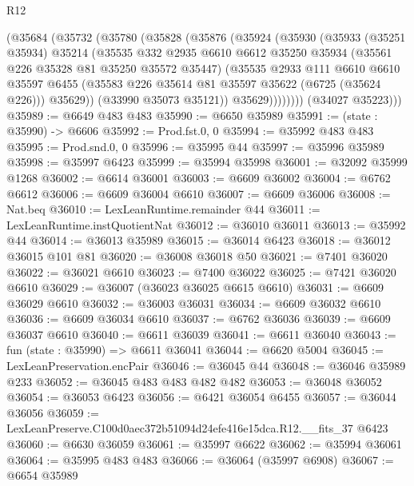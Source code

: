 \begin{lexlean}{R12}
\begin{coremodule}
          (@35684
            (@35732
              (@35780
                (@35828
                  (@35876
                    (@35924
                      (@35930
                        (@35933
                          (@35251 @35934)
                          @35214
                          (@35535
                            @332
                            @2935
                            @6610
                            @6612
                            @35250
                            @35934
                            (@35561 @226 @35328 @81 @35250 @35572 @35447)
                            (@35535
                              @2933
                              @111
                              @6610
                              @6610
                              @35597
                              @6455
                              (@35583 @226 @35614 @81 @35597 @35622 (@6725 (@35624 @226)))
                              @35629))
                          (@33990 @35073 @35121))
                        @35629))))))))
        (@34027 @35223)))
@35989 := @6649 @483 @483
@35990 := @6650 @35989
@35991 := (state : @35990) -> @6606
@35992 := Prod.fst.{0, 0}
@35994 := @35992 @483 @483
@35995 := Prod.snd.{0, 0}
@35996 := @35995 @44
@35997 := @35996 @35989
@35998 := @35997 @6423
@35999 := @35994 @35998
@36001 := @32092 @35999 @1268
@36002 := @6614 @36001
@36003 := @6609 @36002
@36004 := @6762 @6612
@36006 := @6609 @36004 @6610
@36007 := @6609 @36006
@36008 := Nat.beq
@36010 := LexLeanRuntime.remainder @44
@36011 := LexLeanRuntime.instQuotientNat
@36012 := @36010 @36011
@36013 := @35992 @44
@36014 := @36013 @35989
@36015 := @36014 @6423
@36018 := @36012 @36015 @101 @81
@36020 := @36008 @36018 @50
@36021 := @7401 @36020
@36022 := @36021 @6610
@36023 := @7400 @36022
@36025 := @7421 @36020 @6610
@36029 := @36007 (@36023 @36025 @6615 @6610)
@36031 := @6609 @36029 @6610
@36032 := @36003 @36031
@36034 := @6609 @36032 @6610
@36036 := @6609 @36034 @6610
@36037 := @6762 @36036
@36039 := @6609 @36037 @6610
@36040 := @6611 @36039
@36041 := @6611 @36040
@36043 := fun (state : @35990) => @6611 @36041
@36044 := @6620 @5004
@36045 := LexLeanPreservation.encPair
@36046 := @36045 @44
@36048 := @36046 @35989 @233
@36052 := @36045 @483 @483 @482 @482
@36053 := @36048 @36052
@36054 := @36053 @6423
@36056 := @6421 @36054 @6455
@36057 := @36044 @36056
@36059 := LexLeanPreserve.C100d0aec372b51094d24efe416e15dca.R12.__fits_37 @6423
@36060 := @6630 @36059
@36061 := @35997 @6622
@36062 := @35994 @36061
@36064 := @35995 @483 @483
@36066 := @36064 (@35997 @6908)
@36067 := @6654 @35989

\end{coremodule}
\end{lexlean}
